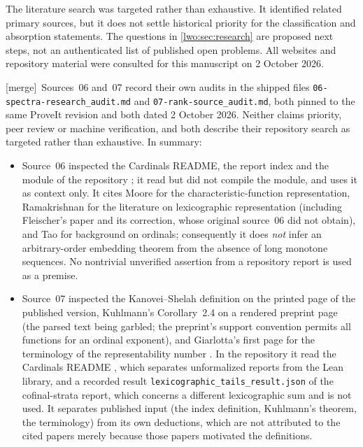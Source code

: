 \documentclass[11pt,a4paper]{article}
\theoremstyle{definition}
\theoremstyle{remark}
\newcommand{\merge}{\textsf{[merge]}}
\begin{document}
The literature search was targeted rather than exhaustive. It identified
related primary sources, but it does not settle historical priority for the
classification and absorption statements. The questions in
\cref{lwo:sec:research} are proposed next steps, not an authenticated list of
published open problems. All websites and repository material were
consulted for this manuscript on 2 October 2026.

\merge\ Sources~06 and~07 record their own audits in the shipped files
\nolinkurl{06-spectra-research_audit.md} and \nolinkurl{07-rank-source_audit.md},
both pinned to the same ProveIt revision and both dated 2 October 2026. Neither
claims priority, peer review or machine verification, and both describe their
repository search as targeted rather than exhaustive. In summary:
\begin{itemize}
\item Source~06 inspected the Cardinals README, the report index
\cite{reports} and the module \cite{signsimplicity} of the repository
\cite{repo}; it read but did not compile the module, and uses it as context
only. It cites Moore \cite[Section~2]{Moore} for the characteristic-function
representation, Ramakrishnan \cite{Ramakrishnan} for the literature on
lexicographic representation (including Fleischer's paper and its
correction, whose original source~06 did not obtain), and Tao \cite{Tao} for
background on ordinals; consequently it does \emph{not} infer an
arbitrary-order embedding theorem from the absence of long monotone
sequences. No nontrivial unverified assertion from a repository report is used
as a premise.
\item Source~07 inspected the Kanovei--Shelah definition on the printed page
of the published version, Kuhlmann's Corollary~2.4 on a rendered preprint page
(the parsed text being garbled; the preprint's support convention permits all
functions for an ordinal exponent), and Giarlotta's first page for the
terminology of the representability number \cite{Giarlotta}. In the
repository it read the Cardinals README \cite{ProveItCardinals}, which separates
unformalized reports from the Lean library, and a recorded result
\nolinkurl{lexicographic_tails_result.json} of the cofinal-strata report, which
concerns a different lexicographic sum and is not used. It separates
published input (the index definition, Kuhlmann's theorem, the terminology)
from its own deductions, which are not attributed to the cited papers merely
because those papers motivated the definitions.
\end{itemize}
\end{document}
